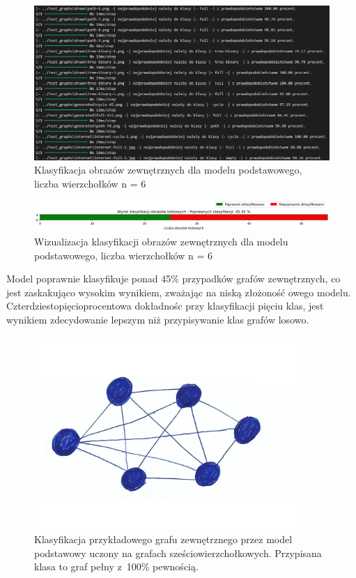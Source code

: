 \begin{figure}[ht]
	\centering
	\includegraphics[width=14cm]{resources/tests/images/v3/base6_txt.png}
	\caption{Klasyfikacja obrazów zewnętrznych dla modelu podstawowego, liczba wierzchołków n = 6}
	\label{Fig:tests-base-3b}
\end{figure}
\FloatBarrier

\begin{figure}[ht]
	\centering
	\includegraphics[width=14cm]{resources/tests/images/v3/base6_bar.png}
	\caption{Wizualizacja klasyfikacji obrazów zewnętrznych dla modelu podstawowego, liczba wierzchołków n = 6}
	\label{Fig:tests-base-3c}
\end{figure}
\FloatBarrier

Model poprawnie klasyfikuje ponad 45\% przypadków grafów zewnętrznych,
co jest zaskakująco wysokim wynikiem, zważając na niską złożoność owego modelu.
Czterdziestopięcioprocentowa dokładnośc przy klasyfikacji pięciu klas,
jest wynikiem zdecydowanie lepszym niż przypisywanie klas grafów losowo.

\begin{figure}[ht]
	\centering
	\includegraphics[width=10cm]{../graph_classification/test_graphs/drawn/full-9.png}
	\caption{Klasyfikacja przykładowego grafu zewnętrznego przez model podstawowy uczony na grafach sześciowierzchołkowych.
		Przypisana klasa to graf pełny z~100\% pewnością.}
	\label{Fig:tests-base-3d}
\end{figure}
\FloatBarrier

